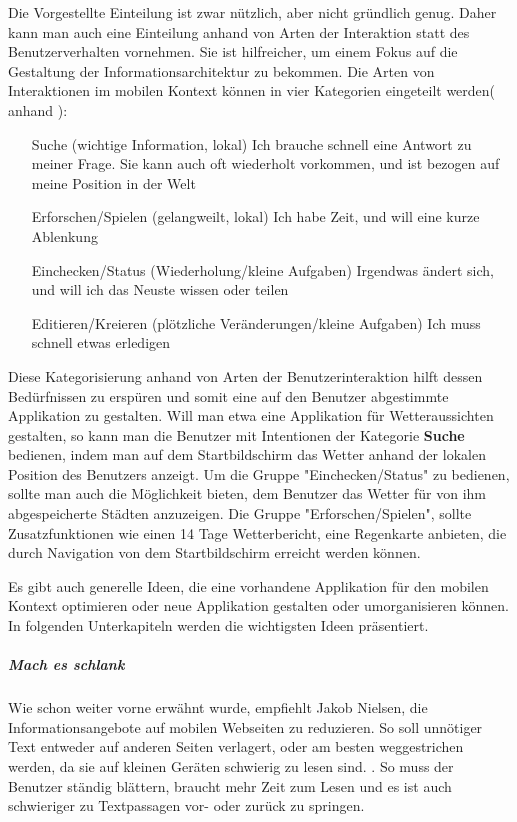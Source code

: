 Die Vorgestellte Einteilung ist zwar nützlich, aber nicht gründlich genug. Daher kann man auch eine Einteilung anhand von Arten der Interaktion statt des Benutzerverhalten vornehmen. Sie ist hilfreicher, um einem Fokus auf die Gestaltung der Informationsarchitektur zu bekommen. Die  Arten von Interaktionen im mobilen Kontext können in vier Kategorien eingeteilt werden( anhand \cite[Seite 50]{mobileFirst}):

\begin{itemize}
 	\item[Suche (wichtige Information, lokal)] Ich brauche schnell eine Antwort zu meiner Frage. Sie kann auch oft wiederholt vorkommen, und ist bezogen auf meine Position in der Welt
 	\item[Erforschen/Spielen (gelangweilt, lokal)] Ich habe Zeit, und will eine kurze Ablenkung
 	\item[Einchecken/Status (Wiederholung/kleine Aufgaben)] Irgendwas ändert sich, und will ich das Neuste wissen oder teilen
 	\item[Editieren/Kreieren (plötzliche Veränderungen/kleine Aufgaben)] Ich muss schnell etwas erledigen
 \end{itemize} 

Diese Kategorisierung anhand von Arten der Benutzerinteraktion hilft dessen Bedürfnissen zu erspüren und somit eine auf den Benutzer abgestimmte Applikation zu gestalten. Will man etwa eine Applikation für Wetteraussichten gestalten, so kann man die Benutzer mit Intentionen der Kategorie \textbf{Suche} bedienen, indem man auf dem Startbildschirm das Wetter anhand der lokalen Position des Benutzers anzeigt. Um die Gruppe "Einchecken/Status" zu bedienen, sollte man auch die Möglichkeit bieten, dem Benutzer das Wetter für von ihm abgespeicherte Städten anzuzeigen. Die Gruppe "Erforschen/Spielen", sollte Zusatzfunktionen wie einen 14 Tage Wetterbericht, eine Regenkarte anbieten, die durch Navigation von dem Startbildschirm erreicht werden können.

Es gibt auch generelle Ideen, die eine vorhandene Applikation für den mobilen Kontext optimieren oder neue Applikation gestalten oder umorganisieren können. In folgenden Unterkapiteln werden die wichtigsten Ideen präsentiert. 

\subparagraph{Mach es schlank} 
\label{subp:entferne_das_fett}

Wie schon weiter vorne erwähnt wurde, empfiehlt Jakob Nielsen, die Informationsangebote auf mobilen Webseiten zu reduzieren. So soll unnötiger Text entweder auf anderen Seiten verlagert, oder am besten weggestrichen werden, da sie auf kleinen Geräten schwierig zu lesen sind. \cite[Seite 102]{Nielsen:2012wj}. So muss der Benutzer ständig blättern, braucht mehr Zeit zum Lesen und es ist auch schwieriger zu Textpassagen vor- oder zurück zu springen.

